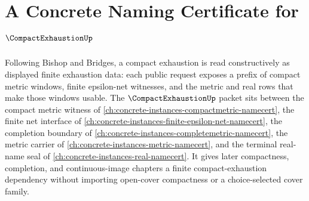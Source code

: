 \chapter{A Concrete Naming Certificate for $\CompactExhaustionUp$}
\label{ch:concrete-instances-compact-exhaustion-namecert}

Following Bishop and Bridges, a compact exhaustion is read constructively as displayed finite exhaustion data: each public request exposes a prefix of compact metric windows, finite epsilon-net witnesses, and the metric and real rows that make those windows usable. The $\CompactExhaustionUp$ packet sits between the compact metric witness of \autoref{ch:concrete-instances-compactmetric-namecert}, the finite net interface of \autoref{ch:concrete-instances-finite-epsilon-net-namecert}, the completion boundary of \autoref{ch:concrete-instances-completemetric-namecert}, the metric carrier of \autoref{ch:concrete-instances-metric-namecert}, and the terminal real-name seal of \autoref{ch:concrete-instances-real-namecert}. It gives later compactness, completion, and continuous-image chapters a finite compact-exhaustion dependency without importing open-cover compactness or a choice-selected cover family.

